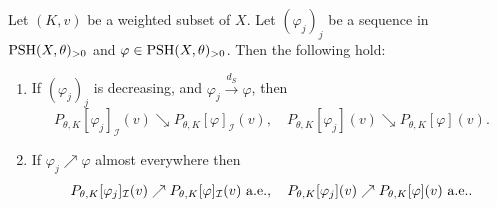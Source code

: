 \begin{proposition}\label{prop:conv_of_K_env}
    Let $(K,v)$ be a weighted subset of $X$. Let $(\varphi_j)_j$ be a sequence in $\mathrm{PSH}(X,\theta)_{>0}$ and $\varphi\in \mathrm{PSH}(X,\theta)_{>0}$. Then the following hold:
\begin{enumerate}
    \item\label{itm:prop:conv_of_K_env:1} If $(\varphi_j)_j$ is decreasing, and $\varphi_j\xrightarrow{d_S}\varphi$, then
    \begin{equation}\label{eq:PthetaKvarphij1}
    P_{\theta,K}[\varphi_j]_{\mathcal{I}}(v) \searrow P_{\theta,K}[\varphi]_{\mathcal{I}}(v),\quad P_{\theta,K}[\varphi_j](v) \searrow P_{\theta,K}[\varphi](v).
    \end{equation}
    \item\label{itm:prop:conv_of_K_env:2} If $\varphi_j \nearrow \varphi$ almost everywhere then
    \[
    P_{\theta,K}[\varphi_j]_{\mathcal{I}}(v) \nearrow P_{\theta,K}[\varphi]_{\mathcal{I}}(v)\textup{ a.e.},\quad P_{\theta,K}[\varphi_j](v) \nearrow P_{\theta,K}[\varphi](v) \textup{ a.e.}.
    \]
\end{enumerate}
\end{proposition}

